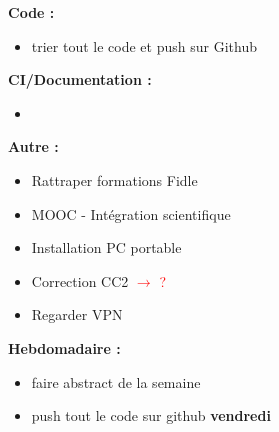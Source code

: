 \textbf{Code :}
\begin{itemize}[label=$\square$] 
	\item trier tout le code et push sur Github
\end{itemize}
\textbf{CI/Documentation :}
\begin{itemize}[label=$\square$] 
	\item 
\end{itemize}
\textbf{Autre :}
\begin{itemize}[label=$\square$] 
	\item Rattraper formations Fidle
	\item MOOC - Intégration scientifique
	\item Installation PC portable
	\item Correction CC2 \textcolor{red}{$\rightarrow$ ?}
	\item Regarder VPN
\end{itemize}
\textbf{Hebdomadaire :}
\begin{itemize}[label=$\square$] 
	\item faire abstract de la semaine 
	\item push tout le code sur github \textbf{vendredi}
\end{itemize}